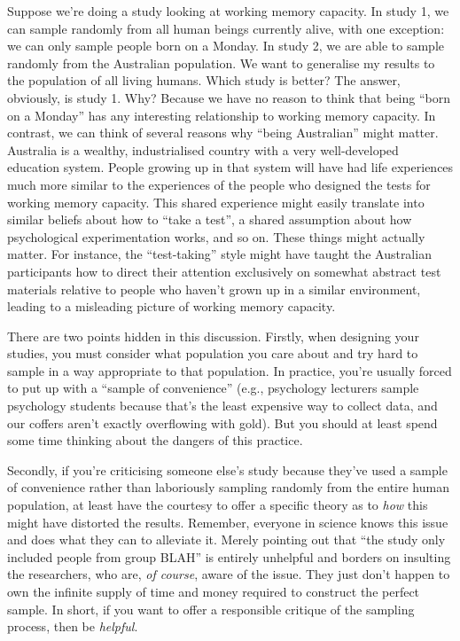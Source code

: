 \documentclass[
]{book}
\theoremstyle{definition}
\theoremstyle{definition}
\theoremstyle{definition}
\theoremstyle{definition}
\theoremstyle{remark}
\begin{document}
Suppose we're doing a study looking at working memory capacity. In study 1, we can sample randomly from all human beings currently alive, with one exception: we can only sample people born on a Monday. In study 2, we are able to sample randomly from the Australian population. We want to generalise my results to the population of all living humans. Which study is better? The answer, obviously, is study 1. Why? Because we have no reason to think that being ``born on a Monday'' has any interesting relationship to working memory capacity. In contrast, we can think of several reasons why ``being Australian'' might matter. Australia is a wealthy, industrialised country with a very well-developed education system. People growing up in that system will have had life experiences much more similar to the experiences of the people who designed the tests for working memory capacity. This shared experience might easily translate into similar beliefs about how to ``take a test'', a shared assumption about how psychological experimentation works, and so on. These things might actually matter. For instance, the ``test-taking'' style might have taught the Australian participants how to direct their attention exclusively on somewhat abstract test materials relative to people who haven't grown up in a similar environment, leading to a misleading picture of working memory capacity.

There are two points hidden in this discussion. Firstly, when designing your studies, you must consider what population you care about and try hard to sample in a way appropriate to that population. In practice, you're usually forced to put up with a ``sample of convenience'' (e.g., psychology lecturers sample psychology students because that's the least expensive way to collect data, and our coffers aren't exactly overflowing with gold). But you should at least spend some time thinking about the dangers of this practice.

Secondly, if you're criticising someone else's study because they've used a sample of convenience rather than laboriously sampling randomly from the entire human population, at least have the courtesy to offer a specific theory as to \emph{how} this might have distorted the results. Remember, everyone in science knows this issue and does what they can to alleviate it. Merely pointing out that ``the study only included people from group BLAH'' is entirely unhelpful and borders on insulting the researchers, who are, \emph{of course}, aware of the issue. They just don't happen to own the infinite supply of time and money required to construct the perfect sample. In short, if you want to offer a responsible critique of the sampling process, then be \emph{helpful}.
\end{document}
